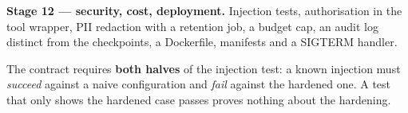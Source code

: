 \begin{projectbox}
\textbf{Stage 12 --- security, cost, deployment.} Injection tests, authorisation
in the tool wrapper, PII redaction with a retention job, a budget cap, an audit
log distinct from the checkpoints, a Dockerfile, manifests and a SIGTERM handler.

The contract requires \textbf{both halves} of the injection test: a known
injection must \emph{succeed} against a naive configuration and \emph{fail}
against the hardened one. A test that only shows the hardened case passes proves
nothing about the hardening.
\end{projectbox}
